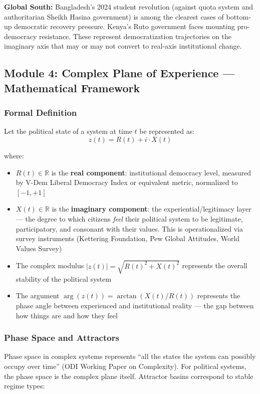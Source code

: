 \documentclass[11pt,letterpaper]{article}
\begin{document}
\textbf{Global South:} Bangladesh's 2024 student revolution (against quota system and authoritarian Sheikh Hasina government) is among the clearest cases of bottom-up democratic recovery pressure. Kenya's Ruto government faces mounting pro-democracy resistance. These represent democratization trajectories on the imaginary axis that may or may not convert to real-axis institutional change.

\subsection{Module 4: Complex Plane of Experience --- Mathematical Framework}

\subsubsection{Formal Definition}

Let the political state of a system at time $t$ be represented as:
\[
  z(t) = R(t) + i \cdot X(t)
\]

where:
\begin{itemize}[noitemsep]
  \item $R(t) \in \mathbb{R}$ is the \textbf{real component}: institutional democracy level, measured by V-Dem Liberal Democracy Index or equivalent metric, normalized to $[-1, +1]$
  \item $X(t) \in \mathbb{R}$ is the \textbf{imaginary component}: the experiential/legitimacy layer --- the degree to which citizens \textit{feel} their political system to be legitimate, participatory, and consonant with their values. This is operationalized via survey instruments (Kettering Foundation, Pew Global Attitudes, World Values Survey)
  \item The complex modulus $|z(t)| = \sqrt{R(t)^2 + X(t)^2}$ represents the overall stability of the political system
  \item The argument $\arg(z(t)) = \arctan(X(t)/R(t))$ represents the phase angle between experienced and institutional reality --- the gap between how things are and how they feel
\end{itemize}

\subsubsection{Phase Space and Attractors}

Phase space in complex systems represents ``all the states the system can possibly occupy over time'' (ODI Working Paper on Complexity). For political systems, the phase space is the complex plane itself. Attractor basins correspond to stable regime types:
\end{document}
